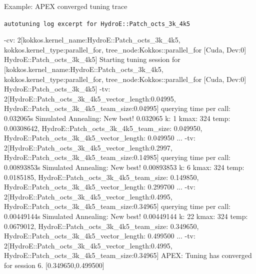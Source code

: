 \documentclass[11pt]{beamer}
\begin{document}
\begin{frame}[fragile,t]{Example: APEX converged tuning trace}
\begin{beamerboxesrounded}[upper=terminal title,lower=terminal body,width=\linewidth,shadow=false]{%
\textcolor{red!70}{\footnotesize\textbullet}\hspace{0.15em}%
\textcolor{yellow!80}{\footnotesize\textbullet}\hspace{0.15em}%
\textcolor{green!70!black}{\footnotesize\textbullet}\hspace{0.55em}%
\texttt{\scriptsize autotuning log excerpt for HydroE::Patch\_octs\_3k\_4k5}}
{\ttfamily\fontsize{4.7}{5.0}\selectfont\color{termText}
  \begin{semiverbatim}
  -cv: 2[kokkos.kernel_name:HydroE::Patch_octs_3k_4k5,
        kokkos.kernel_type:parallel_for,
        tree_node:Kokkos::parallel_for [Cuda, Dev:0] HydroE::Patch_octs_3k_4k5]
  Starting tuning session for [kokkos.kernel_name:HydroE::Patch_octs_3k_4k5,
        kokkos.kernel_type:parallel_for,
        tree_node:Kokkos::parallel_for [Cuda, Dev:0] HydroE::Patch_octs_3k_4k5]
  -tv: 2[HydroE::Patch_octs_3k_4k5_vector_length:0.04995,
        HydroE::Patch_octs_3k_4k5_team_size:0.04995]
  querying time per call: \textcolor{red!80!black}{0.032065s}
\textcolor{hotspotBlue}{Simulated Annealing: New best! \textcolor{red!80!black}{0.032065} k: 1 kmax: 324 temp: 0.00308642,}
\textcolor{hotspotBlue}{HydroE::Patch_octs_3k_4k5_team_size: 0.049950, HydroE::Patch_octs_3k_4k5_vector_length: 0.049950}
  ...
  -tv: 2[HydroE::Patch_octs_3k_4k5_vector_length:0.2997,
        HydroE::Patch_octs_3k_4k5_team_size:0.14985]
  querying time per call: 0.00893853s
\textcolor{hotspotBlue}{Simulated Annealing: New best! 0.00893853 k: 6 kmax: 324 temp: 0.0185185,}
\textcolor{hotspotBlue}{HydroE::Patch_octs_3k_4k5_team_size: 0.149850, HydroE::Patch_octs_3k_4k5_vector_length: 0.299700}
  ...
  -tv: 2[HydroE::Patch_octs_3k_4k5_vector_length:0.4995,
        HydroE::Patch_octs_3k_4k5_team_size:0.34965]
  querying time per call: \textcolor{red!80!black}{0.00449144s}
\textcolor{hlOrange}{Simulated Annealing: New best! \textcolor{red!80!black}{0.00449144} k: 22 kmax: 324 temp: 0.0679012,}
\textcolor{hlOrange}{HydroE::Patch_octs_3k_4k5_team_size: 0.349650, HydroE::Patch_octs_3k_4k5_vector_length: 0.499500}
  ...
  -tv: 2[HydroE::Patch_octs_3k_4k5_vector_length:0.4995,
        HydroE::Patch_octs_3k_4k5_team_size:0.34965]
\textcolor{green!70!black}{APEX: Tuning has converged for session 6.}
\textcolor{green!70!black}{[0.349650,0.499500]}
\end{semiverbatim}}

\end{beamerboxesrounded}
\end{frame}
\end{document}
